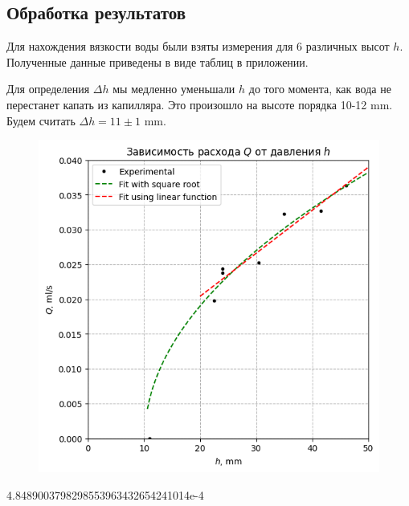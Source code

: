 \documentclass[a4paper,12pt]{report}
\begin{document}
    \begin{multicols}{2}
        \section{Обработка результатов}
        Для нахождения вязкости воды были взяты измерения для 6 различных высот $h$. Полученные данные приведены в виде таблиц в приложении.

        Для определения $\Delta h$ мы медленно уменьшали $h$ до того момента, как вода не перестанет капать из капилляра. Это произошло на высоте порядка 10-12 mm. Будем считать $\Delta h = 11\pm 1$ mm.

        \begin{figure}[H]
            \includegraphics[width=0.9\columnwidth]{../img/output.png}
            \centering
            \label{fig:experimental}
        \end{figure}
        4.8489003798298553963432654241014e-4



    \end{multicols}
\end{document}

